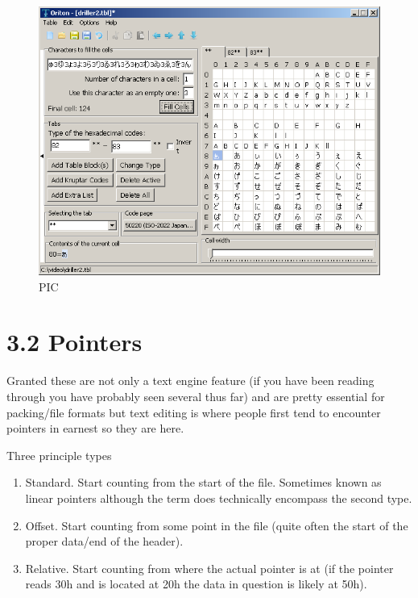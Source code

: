 \documentclass[
]{book}
\providecommand{\tightlist}{%
  \setlength{\itemsep}{0pt}\setlength{\parskip}{0pt}}
\begin{document}
\begin{figure}
\centering
\includegraphics{images/100_home_fast6191_romhackingguide_unrenamed_fil___ders_romhackingguidertexttablemakingOriton1.png}
\caption{PIC}
\end{figure}

\hypertarget{pointers}{%
\section{3.2 Pointers}\label{pointers}}

Granted these are not only a text engine feature (if you have been reading through you have probably seen several thus far) and are pretty essential for packing/file formats but text editing is where people first tend to encounter pointers in earnest so they are here.

Three principle types

\begin{enumerate}
\def\labelenumi{\arabic{enumi}.}
\tightlist
\item
  Standard. Start counting from the start of the file. Sometimes known as linear pointers although the term does technically encompass the second type.
\item
  Offset. Start counting from some point in the file (quite often the start of the proper data/end of the header).
\item
  Relative. Start counting from where the actual pointer is at (if the pointer reads 30h and is located at 20h the data in question is likely at 50h).
\end{enumerate}
\end{document}

